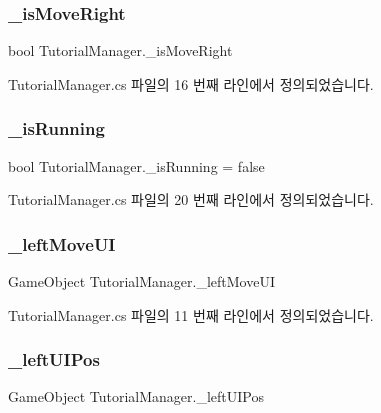 \subsubsection{\texorpdfstring{\_isMoveRight}{\_isMoveRight}}
{\footnotesize\ttfamily bool Tutorial\+Manager.\+\_\+is\+Move\+Right}



Tutorial\+Manager.\+cs 파일의 16 번째 라인에서 정의되었습니다.

\mbox{\label{class_tutorial_manager_acc9109b98a2e1f071427b7005fd94d45}} 
\subsubsection{\texorpdfstring{\_isRunning}{\_isRunning}}
{\footnotesize\ttfamily bool Tutorial\+Manager.\+\_\+is\+Running = false}



Tutorial\+Manager.\+cs 파일의 20 번째 라인에서 정의되었습니다.

\mbox{\label{class_tutorial_manager_a11eb25af75cf96158815fe023bd168ac}} 
\subsubsection{\texorpdfstring{\_leftMoveUI}{\_leftMoveUI}}
{\footnotesize\ttfamily Game\+Object Tutorial\+Manager.\+\_\+left\+Move\+UI}



Tutorial\+Manager.\+cs 파일의 11 번째 라인에서 정의되었습니다.

\mbox{\label{class_tutorial_manager_a0c22170975645ba9a1679a952e3ac1f2}} 
\subsubsection{\texorpdfstring{\_leftUIPos}{\_leftUIPos}}
{\footnotesize\ttfamily Game\+Object Tutorial\+Manager.\+\_\+left\+U\+I\+Pos}



